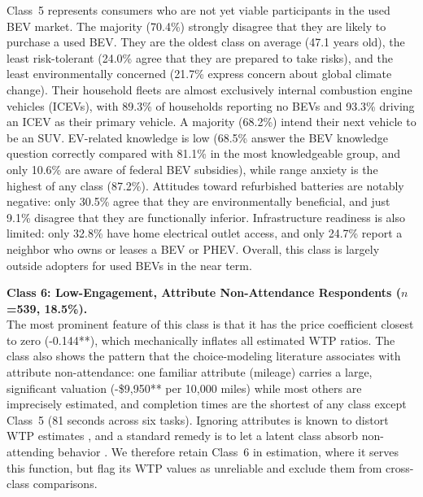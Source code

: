 \documentclass[a4paper,fleqn]{cas-sc}   %
\begin{document}
Class~5 represents consumers who are not yet viable participants in the used BEV market. The majority (70.4\%) strongly disagree that they are likely to purchase a used BEV. They are the oldest class on average (47.1 years old), the least risk-tolerant (24.0\% agree that they are prepared to take risks), and the least environmentally concerned (21.7\% express concern about global climate change). Their household fleets are almost exclusively internal combustion engine vehicles (ICEVs), with 89.3\% of households reporting no BEVs and 93.3\% driving an ICEV as their primary vehicle. A majority (68.2\%) intend their next vehicle to be an SUV. EV-related knowledge is low (68.5\% answer the BEV knowledge question correctly compared with 81.1\% in the most knowledgeable group, and only 10.6\% are aware of federal BEV subsidies), while range anxiety is the highest of any class (87.2\%). Attitudes toward refurbished batteries are notably negative: only 30.5\% agree that they are environmentally beneficial, and just 9.1\% disagree that they are functionally inferior. Infrastructure readiness is also limited: only 32.8\% have home electrical outlet access, and only 24.7\% report a neighbor who owns or leases a BEV or PHEV. Overall, this class is largely outside adopters for used BEVs in the near term.

\medskip

\noindent\textbf{Class 6: Low-Engagement, Attribute Non-Attendance Respondents ($n$=539, 18.5\%).}\\
The most prominent feature of this class is that it has the price coefficient closest to zero (-0.144**), which mechanically inflates all estimated WTP ratios. The class also shows the pattern that the choice-modeling literature associates with attribute non-attendance: one familiar attribute (mileage) carries a large, significant valuation (-\$9,950** per 10,000 miles) while most others are imprecisely estimated, and completion times are the shortest of any class except Class~5 (81 seconds across six tasks). Ignoring attributes is known to distort WTP estimates \parencite{hensherImplicationsWillingnessPay2005}, and a standard remedy is to let a latent class absorb non-attending behavior \parencite{scarpaModellingAttributeNonattendance2009}. We therefore retain Class~6 in estimation, where it serves this function, but flag its WTP values as unreliable and exclude them from cross-class comparisons.
\end{document}
